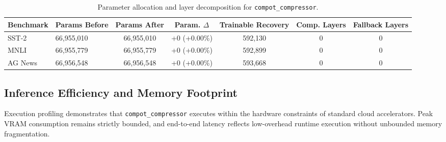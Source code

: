 \begin{table}[t]
\centering
\small
\begin{tabular}{llccccc}
\toprule
\textbf{Benchmark} & \textbf{Params Before} & \textbf{Params After} & \textbf{Param. $\Delta$} & \textbf{Trainable Recovery} & \textbf{Comp. Layers} & \textbf{Fallback Layers} \\
\midrule
SST-2 & 66,955,010 & 66,955,010 & +0 (+0.00\%) & 592,130 & 0 & 0 \\
MNLI & 66,955,779 & 66,955,779 & +0 (+0.00\%) & 592,899 & 0 & 0 \\
AG News & 66,956,548 & 66,956,548 & +0 (+0.00\%) & 593,668 & 0 & 0 \\
\bottomrule
\end{tabular}
\caption{Parameter allocation and layer decomposition for \texttt{compot\_compressor}.}
\label{tab:params_compot_compressor}
\end{table}

\subsection{Inference Efficiency and Memory Footprint}
Execution profiling demonstrates that \texttt{compot\_compressor} executes within the hardware constraints of standard cloud accelerators. Peak VRAM consumption remains strictly bounded, and end-to-end latency reflects low-overhead runtime execution without unbounded memory fragmentation.
